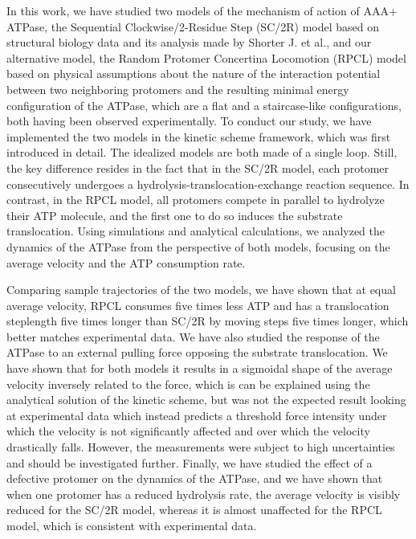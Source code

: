 In this work, we have studied two models of the mechanism of action of AAA+ ATPase, the Sequential Clockwise/2-Residue Step (SC/2R) model based on structural biology data and its analysis made by Shorter J. et al.\cite{shorter_spiraling_2019}, and our alternative model, the Random Protomer Concertina Locomotion (RPCL) model based on physical assumptions about the nature of the interaction potential between two neighboring protomers and the resulting minimal energy configuration of the ATPase, which are a flat and a staircase-like configurations, both having been observed experimentally\cite{shorter_spiraling_2019}. To conduct our study, we have implemented the two models in the kinetic scheme framework, which was first introduced in detail. The idealized models are both made of a single loop. Still, the key difference resides in the fact that in the SC/2R model, each protomer consecutively undergoes a hydrolysis-translocation-exchange reaction sequence. In contrast, in the RPCL model, all protomers compete in parallel to hydrolyze their ATP molecule, and the first one to do so induces the substrate translocation. Using simulations and analytical calculations, we analyzed the dynamics of the ATPase from the perspective of both models, focusing on the average velocity and the ATP consumption rate.

Comparing sample trajectories of the two models, we have shown that at equal average velocity, RPCL consumes five times less ATP and has a translocation steplength five times longer than SC/2R by moving steps five times longer, which better matches experimental data\cite{avellaneda_processive_2020}. We have also studied the response of the ATPase to an external pulling force opposing the substrate translocation. We have shown that for both models it results in a sigmoidal shape of the average velocity inversely related to the force, which is can be explained using the analytical solution of the kinetic scheme, but was not the expected result looking at experimental data which instead predicts a threshold force intensity under which the velocity is not significantly affected and over which the velocity drastically falls. However, the measurements were subject to high uncertainties and should be investigated further\cite{avellaneda_processive_2020}. Finally, we have studied the effect of a defective protomer on the dynamics of the ATPase, and we have shown that when one protomer has a reduced hydrolysis rate, the average velocity is visibly reduced for the SC/2R model, whereas it is almost unaffected for the RPCL model, which is consistent with experimental data\cite{desantis_operational_2012}.

